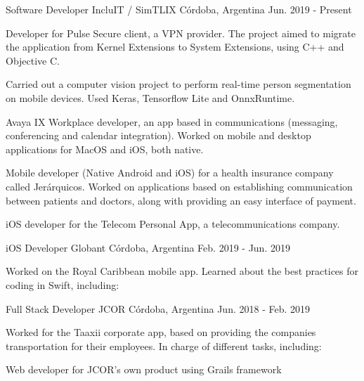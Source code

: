 \documentclass[11pt, a4paper]{resume}
\begin{document}
\begin{cventries}

  \cventry
    {Software Developer}
    {IncluIT / SimTLIX}
    {Córdoba, Argentina}
    {Jun. 2019 - Present}
    {
      \begin{cvitems}
        \item {Developer for Pulse Secure client, a VPN provider. The project aimed to migrate the application from Kernel Extensions to System Extensions, using C++ and Objective C.}
        \item {Carried out a computer vision project to perform real-time person segmentation on mobile devices. Used Keras, Tensorflow Lite and OnnxRuntime.}
	\item {Avaya IX Workplace developer, an app based in communications (messaging, conferencing and calendar integration). Worked on mobile and desktop applications for MacOS and iOS, both native. }
	\item {Mobile developer (Native Android and iOS) for a health insurance company called Jerárquicos. Worked on applications based on establishing communication between patients and doctors, along with providing an easy interface of payment.}
	\item {iOS developer for the Telecom Personal App, a telecommunications company.}
      \end{cvitems}
    }

  \cventry
    {iOS Developer}
    {Globant}
    {Córdoba, Argentina}
    {Feb. 2019 - Jun. 2019}
    {
      \begin{cvitems}
        \item {Worked on the Royal Caribbean mobile app. Learned about the best practices for coding in Swift, including:}
      \end{cvitems}
    }

  \cventry
    {Full Stack Developer}
    {JCOR}
    {Córdoba, Argentina}
    {Jun. 2018 - Feb. 2019}
    {
      \begin{cvitems}
        \item {Worked for the Taaxii corporate app, based on providing the companies transportation for their employees. In charge of different tasks, including:}
		\item {Web developer for JCOR's own product using Grails framework}
      \end{cvitems}
    }


\end{cventries}
\end{document}
